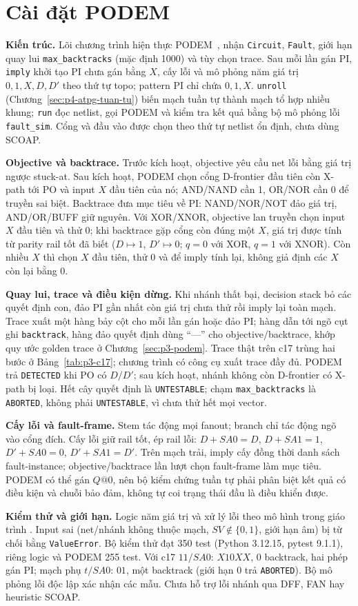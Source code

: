 \chapter{Cài đặt PODEM}
\label{sec:p5-cai-dat-podem}
\textbf{Kiến trúc.}
Lõi chương trình hiện thực PODEM~\cite{p3_goel1981}, nhận \texttt{Circuit},
\texttt{Fault}, giới hạn quay lui \texttt{max\_backtracks} (mặc định 1000)
và tùy chọn trace. Sau mỗi lần gán PI, \texttt{imply} khởi tạo PI chưa gán
bằng $X$, cấy lỗi và mô phỏng năm giá trị $0,1,X,D,D'$ theo thứ tự topo;
pattern PI chỉ chứa $0,1,X$. \texttt{unroll}
(Chương~\ref{sec:p4-atpg-tuan-tu}) biến mạch tuần tự thành mạch tổ hợp
nhiều khung; \texttt{run} đọc netlist, gọi PODEM và kiểm tra kết quả bằng
bộ mô phỏng lỗi \texttt{fault\_sim}. Cổng và đầu vào được chọn theo thứ tự
netlist ổn định, chưa dùng SCOAP.

\textbf{Objective và backtrace.}
Trước kích hoạt, objective yêu cầu net lỗi bằng giá trị ngược stuck-at.
Sau kích hoạt, PODEM chọn cổng D-frontier đầu tiên còn X-path tới PO và
input $X$ đầu tiên của nó; AND/NAND cần 1, OR/NOR cần 0 để truyền sai biệt.
Backtrace đưa mục tiêu về PI: NAND/NOR/NOT đảo giá trị, AND/OR/BUFF giữ
nguyên. Với XOR/XNOR, objective lan truyền chọn input $X$ đầu tiên và thử 0;
khi backtrace gặp cổng còn đúng một $X$, giá trị được tính từ parity rail tốt
đã biết ($D\mapsto1$, $D'\mapsto0$; $q=0$ với XOR, $q=1$ với XNOR). Còn nhiều
$X$ thì chọn $X$ đầu tiên, thử 0 và để imply tính lại, không giả định các
$X$ còn lại bằng 0.

\textbf{Quay lui, trace và điều kiện dừng.}
Khi nhánh thất bại, decision stack bỏ các quyết định con, đảo PI gần nhất
còn giá trị chưa thử rồi imply lại toàn mạch. Trace xuất một hàng bảy cột
cho mỗi lần gán hoặc đảo PI; hàng dẫn tới ngõ cụt ghi \texttt{backtrack},
hàng đảo quyết định dùng ``—'' cho objective/backtrace, khớp quy ước golden
trace ở Chương~\ref{sec:p3-podem}. Trace thật trên c17 trùng hai bước ở
Bảng~\ref{tab:p3-c17}; chương trình có công cụ xuất trace đầy đủ.
PODEM trả \texttt{DETECTED} khi PO có $D/D'$; sau kích hoạt, nhánh không còn
D-frontier có X-path bị loại. Hết cây quyết định là \texttt{UNTESTABLE};
chạm \texttt{max\_backtracks} là \texttt{ABORTED}, không phải
\texttt{UNTESTABLE}, vì chưa thử hết mọi vector.

\textbf{Cấy lỗi và fault-frame.}
Stem tác động mọi fanout; branch chỉ tác động ngõ vào cổng đích.
Cấy lỗi giữ rail tốt, ép rail lỗi: $D+SA0=D$, $D+SA1=1$,
$D'+SA0=0$, $D'+SA1=D'$. Trên mạch trải, imply cấy đồng thời danh sách
fault-instance; objective/backtrace lần lượt chọn fault-frame làm mục tiêu.
PODEM có thể gán $Q@0$, nên bộ kiểm chứng tuần tự phải phân biệt kết quả
có điều kiện và chuỗi bảo đảm, không tự coi trạng thái đầu là điều khiển được.

\textbf{Kiểm thử và giới hạn.}
Logic năm giá trị và xử lý lỗi theo mô hình trong giáo trình
\cite[Ch.~3--4]{p1_wang2006}. Input sai (net/nhánh không thuộc mạch,
$SV\notin\{0,1\}$, giới hạn âm) bị từ chối bằng \texttt{ValueError}.
Bộ kiểm thử đạt 350 test (Python 3.12.15, pytest 9.1.1), riêng logic và
PODEM 255 test. Với c17 $11/SA0$: $X10XX$, 0 backtrack, hai phép gán PI;
mạch phụ $t/SA0$: $01$, một backtrack (giới hạn 0 trả \texttt{ABORTED}).
Bộ mô phỏng lỗi độc lập xác nhận các mẫu. Chưa hỗ trợ lỗi nhánh qua DFF, FAN hay
heuristic SCOAP.
